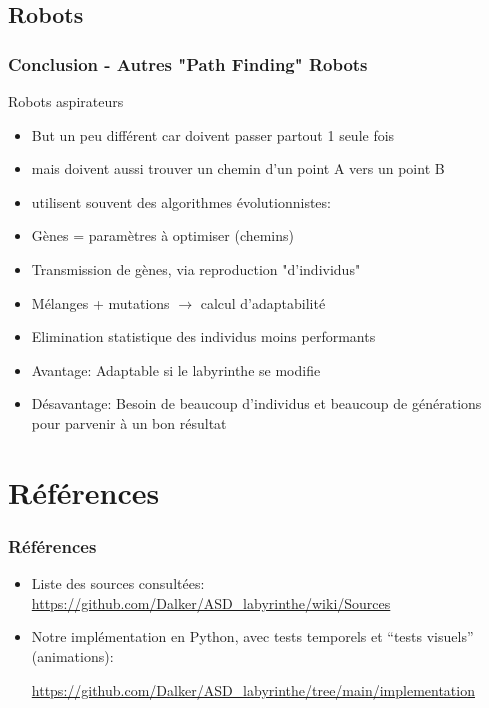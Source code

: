 \documentclass[]{beamer}
\begin{document}
\subsection{Robots}
\begin{frame}
  \frametitle{Conclusion - Autres "Path Finding" Robots}
  Robots aspirateurs
  \begin{itemize} \item But un peu différent car doivent passer partout 1 seule fois
  \item mais doivent aussi trouver un chemin d'un point A vers un point B
  \item utilisent souvent des algorithmes évolutionnistes:
  \item Gènes = paramètres à optimiser (chemins) 
  \item Transmission de gènes, via reproduction "d'individus"
  \item Mélanges + mutations $\rightarrow$ calcul d'adaptabilité
  \item Elimination statistique des individus moins performants
  \item Avantage: Adaptable si le labyrinthe se modifie
  \item Désavantage: Besoin de beaucoup d'individus et beaucoup de générations 
   pour parvenir à un bon résultat  
  \end{itemize}
\end{frame}

\section{Références}
\begin{frame}
  \frametitle{Références}
  \begin{itemize}
  \item Liste des sources consultées:
    \url{https://github.com/Dalker/ASD_labyrinthe/wiki/Sources}
  \item Notre implémentation en Python, avec tests temporels et ``tests
    visuels'' (animations):
    
    \url{https://github.com/Dalker/ASD_labyrinthe/tree/main/implementation}
  \end{itemize}
\end{frame}
\end{document}
